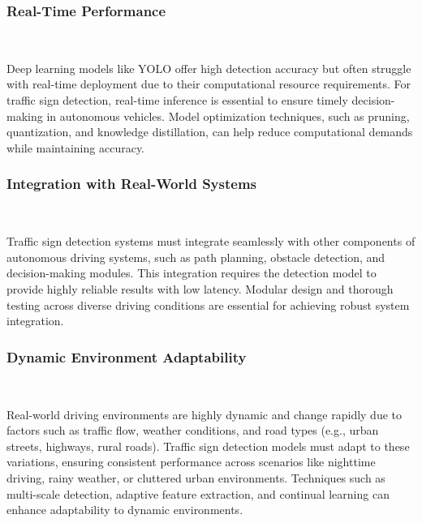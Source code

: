 \documentclass[letterpaper, 10 pt, conference]{ieeeconf}
\begin{document}
\subsubsection{Real-Time Performance}\

Deep learning models like YOLO offer high detection accuracy but often struggle with real-time deployment due to their computational resource requirements. For traffic sign detection, real-time inference is essential to ensure timely decision-making in autonomous vehicles. Model optimization techniques, such as pruning, quantization, and knowledge distillation, can help reduce computational demands while maintaining accuracy.

\subsubsection{Integration with Real-World Systems}\

Traffic sign detection systems must integrate seamlessly with other components of autonomous driving systems, such as path planning, obstacle detection, and decision-making modules. This integration requires the detection model to provide highly reliable results with low latency. Modular design and thorough testing across diverse driving conditions are essential for achieving robust system integration.

\subsubsection{Dynamic Environment Adaptability}\

Real-world driving environments are highly dynamic and change rapidly due to factors such as traffic flow, weather conditions, and road types (e.g., urban streets, highways, rural roads). Traffic sign detection models must adapt to these variations, ensuring consistent performance across scenarios like nighttime driving, rainy weather, or cluttered urban environments. Techniques such as multi-scale detection, adaptive feature extraction, and continual learning can enhance adaptability to dynamic environments.

 
 
\end{document}
